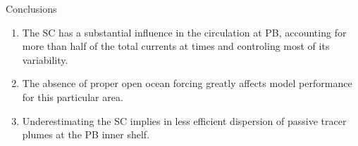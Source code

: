 \documentclass[final]{beamer}
\newlength{\onecolwid}
\begin{document}
\begin{frame}[t]
\begin{columns}[t]
\begin{column}{\onecolwid}
    \begin{alertblock}{Conclusions}

    \begin{small}
    \begin{enumerate}
    \item The SC has a substantial influence in the circulation at PB, accounting for more than half of the total currents at times and controling most of its variability.
    \item The absence of proper open ocean forcing greatly affects model performance for this particular area.
    \item Underestimating the SC implies in less efficient dispersion of passive tracer plumes at the PB inner shelf. 
    \end{enumerate}
    \end{small}

    \end{alertblock}









\end{column}
\end{columns}
\end{frame}
\end{document}
